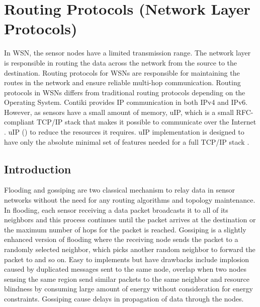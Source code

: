 

\section{Routing Protocols (Network Layer Protocols)}
\label{routingProtocols}
In WSN, the sensor nodes have a limited transmission range.
The network layer is responsible in routing the data across the network from the source to the destination.
Routing protocols for WSNs are responsible for maintaining the routes in the network and ensure reliable multi-hop communication.
Routing protocols in WSNs differs from traditional routing protocols depending on the Operating System.
Contiki provides IP communication in both IPv4 and IPv6. However, as sensors have a small amount of memory, uIP, which is a small RFC-compliant TCP/IP stack that makes it possible to communicate over the Internet \cite{contikiDoc, contikiUIP}. uIP () to reduce the resources it requires.
uIP implementation is designed to have only the absolute minimal set of features needed for a full TCP/IP stack \cite{contikiDoc, contikiUIP}.

\subsection{Introduction}
Flooding and gossiping are two classical mechanism to relay data in sensor networks without the need for any routing algorithms and topology maintenance. In flooding, each sensor receiving a data packet broadcasts it to all of its neighbors and this process continues until the packet arrives at the destination or the maximum number of hops for the packet is reached. Gossiping is a slightly enhanced version of flooding where the receiving node sends the packet to a randomly selected neighbor, which picks another random neighbor to forward the packet to and so on. Easy to implements but have drawbacks include implosion caused by duplicated messages sent to the same node, overlap when two nodes sensing the same region send similar packets to the same neighbor and resource blindness by consuming large amount of energy without consideration for energy constraints. Gossiping cause delays in propagation of data through the nodes. \cite{akkaya2005survey} 

